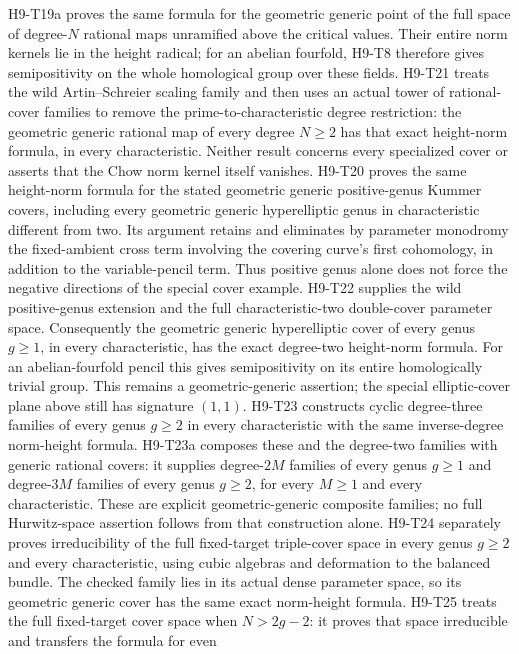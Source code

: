 H9-T19a proves the same formula for the geometric generic point of
the full space of degree-$N$ rational maps unramified above the
critical values. Their entire norm kernels lie in the height
radical; for an abelian fourfold, H9-T8 therefore gives
semipositivity on the whole homological group over these fields.
H9-T21 treats the wild Artin--Schreier scaling family and then
uses an actual tower of rational-cover families to remove the
prime-to-characteristic degree restriction: the geometric generic
rational map of every degree $N\ge2$ has that exact height-norm
formula, in every characteristic.
Neither result concerns every specialized cover or asserts that
the Chow norm kernel itself vanishes.
H9-T20 proves the same height-norm formula for the stated geometric
generic positive-genus Kummer covers, including every geometric
generic hyperelliptic genus in characteristic different from two.
Its argument retains and eliminates by parameter monodromy the
fixed-ambient cross term involving the covering curve's first
cohomology, in addition to the variable-pencil term. Thus positive
genus alone does not force the negative directions of the special
cover example.
H9-T22 supplies the wild positive-genus extension and the full
characteristic-two double-cover parameter space. Consequently the
geometric generic hyperelliptic cover of every genus $g\ge1$,
in every characteristic, has the exact degree-two height-norm
formula. For an abelian-fourfold pencil this gives semipositivity
on its entire homologically trivial group. This remains a
geometric-generic assertion; the special elliptic-cover plane
above still has signature $(1,1)$.
H9-T23 constructs cyclic degree-three families of every genus
$g\ge2$ in every characteristic with the same inverse-degree
norm-height formula. H9-T23a composes these and the degree-two
families with generic rational covers: it supplies degree-$2M$
families of every genus $g\ge1$ and degree-$3M$ families of every
genus $g\ge2$, for every $M\ge1$ and every characteristic.
These are explicit geometric-generic composite families;
no full Hurwitz-space assertion follows from that construction
alone. H9-T24 separately proves irreducibility of the full
fixed-target triple-cover space in every genus $g\ge2$ and every
characteristic, using cubic algebras and deformation to the balanced
bundle. The checked family lies in its actual dense parameter space,
so its geometric generic cover has the same exact norm-height formula.
H9-T25 treats the full fixed-target cover space when $N>2g-2$:
it proves that space irreducible and transfers the formula for even
